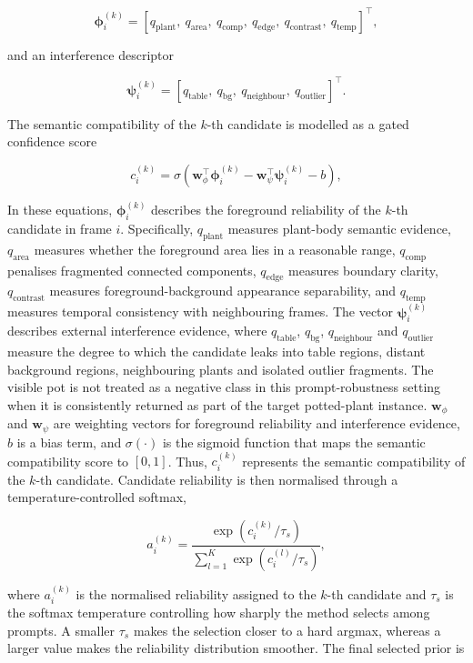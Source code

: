 \documentclass[a4paper]{cas-sc}
\begin{document}
\[
\boldsymbol{\phi}_i^{(k)}=\left[
q_{\text{plant}},\ q_{\text{area}},\ q_{\text{comp}},\ q_{\text{edge}},\ q_{\text{contrast}},\ q_{\text{temp}}
\right]^{\top},
\]

and an interference descriptor

\[
\boldsymbol{\psi}_i^{(k)}=\left[
q_{\text{table}},\ q_{\text{bg}},\ q_{\text{neighbour}},\ q_{\text{outlier}}
\right]^{\top}.
\]

The semantic compatibility of the \(k\)-th candidate is modelled as a gated confidence score

\[
c_i^{(k)}=\sigma\!\left(
\mathbf{w}_{\phi}^{\top}\boldsymbol{\phi}_i^{(k)}
-\mathbf{w}_{\psi}^{\top}\boldsymbol{\psi}_i^{(k)}-b
\right),
\]

In these equations, \(\boldsymbol{\phi}_i^{(k)}\) describes the foreground reliability of the \(k\)-th candidate in frame \(i\). Specifically, \(q_{\text{plant}}\) measures plant-body semantic evidence, \(q_{\text{area}}\) measures whether the foreground area lies in a reasonable range, \(q_{\text{comp}}\) penalises fragmented connected components, \(q_{\text{edge}}\) measures boundary clarity, \(q_{\text{contrast}}\) measures foreground-background appearance separability, and \(q_{\text{temp}}\) measures temporal consistency with neighbouring frames. The vector \(\boldsymbol{\psi}_i^{(k)}\) describes external interference evidence, where \(q_{\text{table}}\), \(q_{\text{bg}}\), \(q_{\text{neighbour}}\) and \(q_{\text{outlier}}\) measure the degree to which the candidate leaks into table regions, distant background regions, neighbouring plants and isolated outlier fragments. The visible pot is not treated as a negative class in this prompt-robustness setting when it is consistently returned as part of the target potted-plant instance. \(\mathbf{w}_{\phi}\) and \(\mathbf{w}_{\psi}\) are weighting vectors for foreground reliability and interference evidence, \(b\) is a bias term, and \(\sigma(\cdot)\) is the sigmoid function that maps the semantic compatibility score to \([0,1]\). Thus, \(c_i^{(k)}\) represents the semantic compatibility of the \(k\)-th candidate. Candidate reliability is then normalised through a temperature-controlled softmax,

\[
a_i^{(k)}=\frac{\exp\left(c_i^{(k)}/\tau_s\right)}
{\sum_{l=1}^{K}\exp\left(c_i^{(l)}/\tau_s\right)} ,
\]

where \(a_i^{(k)}\) is the normalised reliability assigned to the \(k\)-th candidate and \(\tau_s\) is the softmax temperature controlling how sharply the method selects among prompts. A smaller \(\tau_s\) makes the selection closer to a hard argmax, whereas a larger value makes the reliability distribution smoother. The final selected prior is
\end{document}
